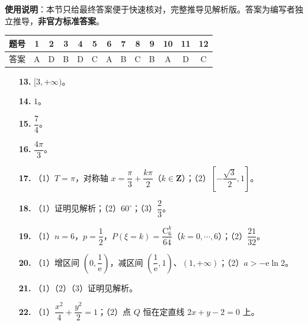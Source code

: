 
\begin{gknotice}
\textbf{使用说明}：本节只给最终答案便于快速核对，完整推导见解析版。答案为编写者独立推导，\textbf{非官方标准答案}。
\end{gknotice}

\begin{center}\begin{tabular}{ccccccccccccc}
\toprule
题号 & 1 & 2 & 3 & 4 & 5 & 6 & 7 & 8 & 9 & 10 & 11 & 12 \\
\midrule
答案 & A & D & B & D & C & A & B & C & B & A & D & C \\
\bottomrule
\end{tabular}\end{center}

\begin{itemize}[leftmargin=2.6em]
  \item[\textbf{13.}] $[3,+\infty)$。
  \item[\textbf{14.}] $1$。
  \item[\textbf{15.}] $\dfrac74$。
  \item[\textbf{16.}] $\dfrac{4\pi}3$。
\end{itemize}

\begin{itemize}[leftmargin=2.6em]
  \item[\textbf{17.}] （1）$T=\pi$，对称轴 $x=\dfrac{\pi}3+\dfrac{k\pi}2$（$k\in\mathbf Z$）；（2）$\left[-\dfrac{\sqrt3}2,1\right]$。
  \item[\textbf{18.}] （1）证明见解析；（2）$60^\circ$；（3）$\dfrac23$。
  \item[\textbf{19.}] （1）$n=6$，$p=\dfrac12$，$P(\xi=k)=\dfrac{\mathrm C_6^k}{64}$（$k=0,\cdots,6$）；（2）$\dfrac{21}{32}$。
  \item[\textbf{20.}] （1）增区间 $\left(0,\dfrac1{\mathrm e}\right)$，减区间 $\left(\dfrac1{\mathrm e},1\right)$、$(1,+\infty)$；（2）$a>-\mathrm e\ln2$。
  \item[\textbf{21.}] （1）（2）（3）证明见解析。
  \item[\textbf{22.}] （1）$\dfrac{x^2}4+\dfrac{y^2}2=1$；（2）点 $Q$ 恒在定直线 $2x+y-2=0$ 上。
\end{itemize}
